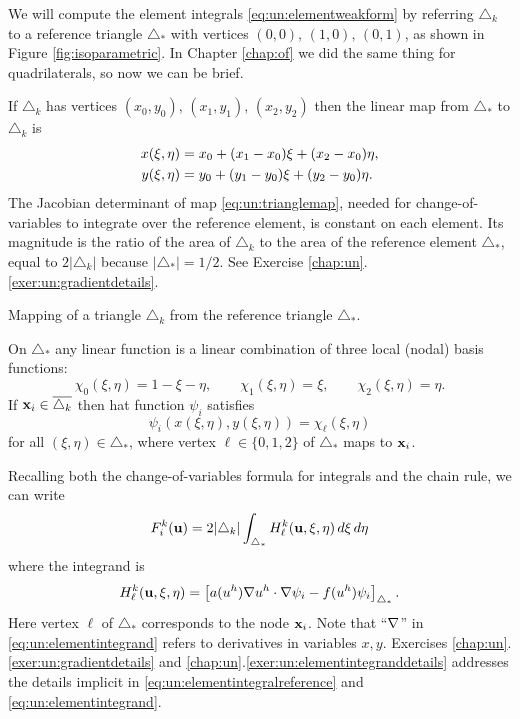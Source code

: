 We will compute the element integrals \eqref{eq:un:elementweakform} by referring $\triangle_k$ to a reference triangle $\triangle_\ast$ with vertices $(0,0),\,(1,0),\,(0,1)$, as shown in Figure \ref{fig:isoparametric}.  In Chapter \ref{chap:of} we did the same thing for quadrilaterals, so now we can be brief.

If $\triangle_k$ has vertices $(x_0,y_0),\,(x_1,y_1),\,(x_2,y_2)$ then the linear map from $\triangle_\ast$ to $\triangle_k$ is
\begin{align}
x(\xi,\eta) &= x_0 + (x_1-x_0) \xi + (x_2-x_0) \eta, \label{eq:un:trianglemap} \\
y(\xi,\eta) &= y_0 + (y_1-y_0) \xi + (y_2-y_0) \eta. \notag
\end{align}
The Jacobian determinant of map \eqref{eq:un:trianglemap}, needed for change-of-variables to integrate over the reference element, is constant on each element.  Its magnitude is the ratio of the area of $\triangle_k$ to the area of the reference element $\triangle_\ast$, equal to $2|\triangle_k|$ because $|\triangle_\ast|=1/2$.  See Exercise \ref{chap:un}.\ref{exer:un:gradientdetails}.

\begin{marginfigure}

\caption{Mapping of a triangle $\triangle_k$ from the reference triangle $\triangle_\ast$.}
\label{fig:isoparametric}
\end{marginfigure}

On $\triangle_\ast$ any linear function is a linear combination of three local (nodal) basis functions:
\begin{equation}
\chi_0(\xi,\eta) = 1-\xi-\eta, \qquad \chi_1(\xi,\eta) = \xi, \qquad \chi_2(\xi,\eta) = \eta. \label{eq:un:chiformulas}
\end{equation}
If $\mathbf{x}_i\in\overline{\triangle_k}$ then hat function $\psi_i$ satisfies
\begin{equation}
\psi_i(x(\xi,\eta),y(\xi,\eta)) = \chi_\ell(\xi,\eta) \label{eq:un:psichimap}
\end{equation}
for all $(\xi,\eta)\in\triangle_\ast$, where vertex $\ell \in \{0,1,2\}$ of $\triangle_\ast$ maps to $\mathbf{x}_i$.

Recalling both the change-of-variables formula for integrals and the chain rule, we can write
\begin{equation}
F_i^k(\mathbf{u}) = 2 |\triangle_k| \int_{\triangle_\ast} H_\ell^k(\mathbf{u},\xi,\eta)\,d\xi\,d\eta \label{eq:un:elementintegralreference}
\end{equation}
where the integrand is
\begin{equation}
H_\ell^k(\mathbf{u},\xi,\eta) = \left[a(u^h) \nabla u^h \cdot \nabla \psi_i - f(u^h) \psi_i\right]_{\triangle_\ast}.  \label{eq:un:elementintegrand}
\end{equation}
Here vertex $\ell$ of $\triangle_\ast$ corresponds to the node $\mathbf{x}_i$.  Note that ``$\nabla$'' in \eqref{eq:un:elementintegrand} refers to derivatives in variables $x,y$.  Exercises \ref{chap:un}.\ref{exer:un:gradientdetails} and \ref{chap:un}.\ref{exer:un:elementintegranddetails} addresses the details implicit in \eqref{eq:un:elementintegralreference} and \eqref{eq:un:elementintegrand}.

